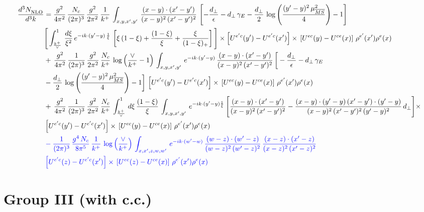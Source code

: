 \documentclass[10pt]{article}
\numberwithin{equation}{section}
\newcommand{\nc}{\color{blue}}
\begin{document}
\begin{align}
    \frac{d^{3}N_{\rm NLO}^{\rm}}{d^{3}k}  & =  \frac{g^{2}}{4\pi^{2}}\, \frac{N_{c}}{(2\pi)^{3}}\,\frac{g^{2}}{2\pi^{2}}\, \frac{1}{k^{+}}\,\int_{x,y,x',y'}\,\frac{(x-y)\cdot (x'-y')}{(x-y)^{2}\,(x'-y')^{2}}\,\left[-\frac{d_{\perp}}{\epsilon}-d_{\perp}\,\gamma_{E}-\frac{d_{\perp}}{2}\,\log{\left(\frac{(y'-y)^{2}\,\mu^{2}_{\overline{MS}}}{4}\right)}-1\right]\,\notag \\ & \Bigg[\int_{\frac{k^{+}}{\vee}}^{1}\,\frac{d\xi}{\xi^{2}}\,e^{-ik\cdot (y'-y)\,\frac{1}{\xi}}\,\left[\xi\,(1-\xi)+\frac{(1-\xi)}{\xi}+\frac{\xi}{(1-\xi)_{+}}\right]\Bigg]\times \left[U^{e'c}(y') - U^{e'c}(x')\right] \times\, \left[U^{ec}(y) - U^{ce}(x)\right]\, \rho^{e'}(x') \rho^{e}(x) \notag \\
&  +\, \frac{g^{2}}{4\pi^{2}}\, \frac{1}{(2\pi)^{3}}\,\frac{g^{2}}{2\pi^{2}}\, \frac{N_{c}}{k^{+}}\,\log{\left(\frac{\vee}{k^{+}}-1\right)}\,\int_{x,y,x',y'}\,e^{-ik\cdot (y'-y)}\,\frac{(x-y)\cdot (x'-y')}{(x-y)^{2}\,(x'-y')^{2}}\,\bigg[-\frac{d_{\perp}}{\epsilon}-d_{\perp}\,\gamma_{E}\notag \\ & -\frac{d_{\perp}}{2}\,\log{\left(\frac{(y'-y)^{2}\,\mu^{2}_{\overline{MS}}}{4}\right)}-1\bigg]\,\left[U^{e'c}(y') - U^{e'c}(x')\right] \times\, \left[U^{ec}(y) - U^{ce}(x)\right]\, \rho^{e'}(x') \rho^{e}(x) \notag \\
& +\,\frac{g^{2}}{4\pi^{2}}\, \frac{1}{(2\pi)^{3}}\,\frac{g^{2}}{2\pi^{2}}\, \frac{N_{c}}{k^{+}}\,\int_{\frac{k^{+}}{\vee}}^{1}\,d\xi\, \frac{(1-\xi)}{\xi}\, \int_{x,y,x',y'}\,e^{-ik\cdot (y'-y)\frac{1}{\xi}}\,\Bigg[\frac{(x-y)\cdot (x'-y')}{(x-y)^{2}\, (x'-y')^{2}} -\frac{(x-y)\cdot (y'-y)\, (x'-y')\cdot (y'-y)}{(x-y)^{2}\,(x'-y')^{2}\,(y'-y)^{2}}\,d_{\perp}\Bigg]\times\notag \\ &  \left[U^{e'c}(y') - U^{e'c}(x')\right] \times\, \left[U^{ec}(y) - U^{ce}(x)\right]\, \rho^{e'}(x') \rho^{e}(x) \notag \\
& \nc  -\frac{1}{(2\pi)^{3}}\,\frac{g^{4}\,N_{c}}{8\pi^{5}}\,\frac{1}{k^{+}}\,\log{\left(\frac{\vee}{k^{+}}\right)}\,\int_{x,x',z,w,w'}\,e^{-ik\cdot (w'-w)}\,\frac{(w-z)\cdot(w'-z)}{(w-z)^{2}\,(w'-z)^{2}}\,\frac{(x-z)\cdot(x'-z)}{(x-z)^{2}\,(x'-z)^{2}}\notag \\ & \nc  \left[U^{e'c}(z) - U^{e'c}(x')\right] \times\, \left[U^{ec}(z) - U^{ce}(x)\right]\, \rho^{e'}(x') \rho^{e}(x) \label{eq:F:G2IV}
\end{align}

\section{Group III (with c.c.)}\label{sec:FgIII}
\end{document}
